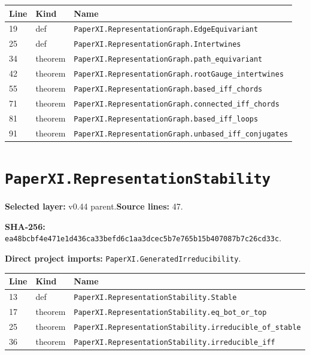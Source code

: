 \documentclass[10pt,oneside]{book}
\begin{document}
\begin{longtable}{@{}p{}p{}p{}@{}}\toprule Line&Kind&Name\\\midrule\endhead

19&def&\nolinkurl{PaperXI.RepresentationGraph.EdgeEquivariant}\\

25&def&\nolinkurl{PaperXI.RepresentationGraph.Intertwines}\\

34&theorem&\nolinkurl{PaperXI.RepresentationGraph.path_equivariant}\\

42&theorem&\nolinkurl{PaperXI.RepresentationGraph.rootGauge_intertwines}\\

55&theorem&\nolinkurl{PaperXI.RepresentationGraph.based_iff_chords}\\

71&theorem&\nolinkurl{PaperXI.RepresentationGraph.connected_iff_chords}\\

81&theorem&\nolinkurl{PaperXI.RepresentationGraph.based_iff_loops}\\

91&theorem&\nolinkurl{PaperXI.RepresentationGraph.unbased_iff_conjugates}\\

\bottomrule\end{longtable}

\section{\texorpdfstring{\nolinkurl{PaperXI.RepresentationStability}}{PaperXI.RepresentationStability}}\label{module:PaperXI.RepresentationStability}

\textbf{Selected layer:} v0.44 parent.\quad\textbf{Source lines:} 47.\par\textbf{SHA-256:} {\scriptsize\nolinkurl{ea48bcbf4e471e1d436ca33befd6c1aa3dcec5b7e765b15b407087b7c26cd33c}}.


\textbf{Direct project imports:} \nolinkurl{PaperXI.GeneratedIrreducibility}.

\begin{longtable}{@{}p{}p{}p{}@{}}\toprule Line&Kind&Name\\\midrule\endhead

13&def&\nolinkurl{PaperXI.RepresentationStability.Stable}\\

17&theorem&\nolinkurl{PaperXI.RepresentationStability.eq_bot_or_top}\\

25&theorem&\nolinkurl{PaperXI.RepresentationStability.irreducible_of_stable}\\

36&theorem&\nolinkurl{PaperXI.RepresentationStability.irreducible_iff}\\

\bottomrule\end{longtable}
\end{document}
